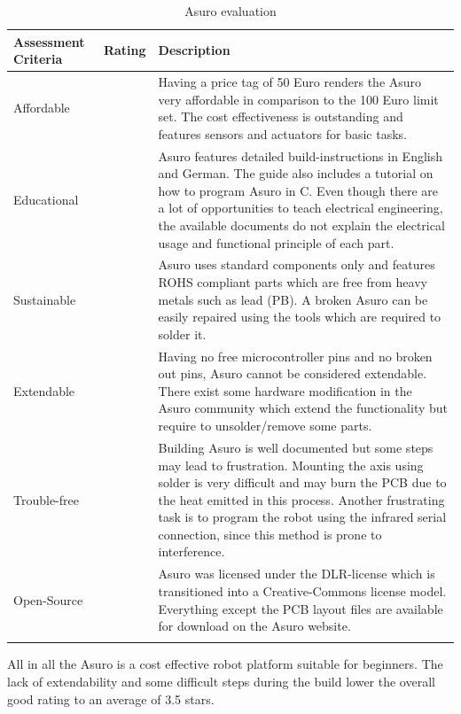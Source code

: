 \documentclass[11pt,a4paper]{article}
\newcounter{starnumber}
\newcommand{\stars}[1]{
  \forloop{starnumber}{1}{\value{starnumber} < 6}{
    \ifthenelse{#1 < \value{starnumber}}{\ding{73}}{\ding{72}}%
  }
}
\begin{document}
\begin{longtable}{p{}p{}p{}}
\toprule
Assessment Criteria    & Rating & Description \\
\midrule
Affordable      & \stars{5}    & Having a price tag of 50 Euro renders the Asuro very affordable in comparison to the 100 Euro limit set. The cost effectiveness is outstanding and features sensors and actuators for basic tasks.     \\
Educational     & \stars{3}     & Asuro features detailed build-instructions in English and German. The guide also includes a tutorial on how to program Asuro in C. Even though there are a lot of opportunities to teach electrical engineering, the available documents do not explain the electrical usage and functional principle of each part. \\
Sustainable       & \stars{4}     & Asuro uses standard components only and features ROHS compliant parts which are free from heavy metals such as lead (PB). A broken Asuro can be easily repaired using the tools which are required to solder it. \\
Extendable & \stars{2}      & Having no free microcontroller pins and no broken out pins, Asuro cannot be considered extendable. There exist some hardware modification in the Asuro community which extend the functionality but require to unsolder/remove some parts.  \\
Trouble-free & \stars{3} & Building Asuro is well documented but some steps may lead to frustration. Mounting the axis using solder is very difficult and may burn the PCB due to the heat emitted in this process. Another frustrating task is to program the robot using the infrared serial connection, since this method is prone to interference. \\
Open-Source & \stars{4} & Asuro was licensed under the DLR-license which is transitioned into a Creative-Commons license model. Everything except the PCB layout files are available for download on the Asuro website.\\
\bottomrule
\caption{Asuro evaluation}
\label{tbl:asuro_eval}
\end{longtable}

All in all the Asuro is a cost effective robot platform suitable for beginners. The lack of extendability and some difficult steps during the build lower the overall good rating to an average of 3.5 stars. 
\end{document}

